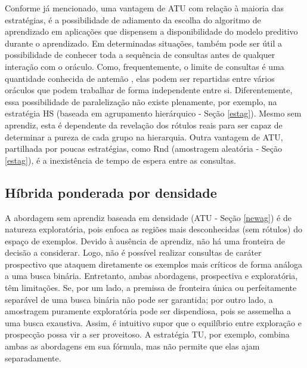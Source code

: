 Conforme já mencionado, uma vantagem de ATU com relação à maioria das estratégias, é a possibilidade de adiamento da escolha do algoritmo de aprendizado em aplicações que dispensem a disponibilidade do modelo preditivo durante o aprendizado.
Em determinadas situações, também pode ser útil a possibilidade de conhecer toda a sequência de consultas antes de qualquer interação com o oráculo.
Como, frequentemente, o limite de consultas é uma quantidade conhecida de antemão \cite{settles2010active}, elas podem ser repartidas entre vários oráculos que podem trabalhar de forma independente entre si.
Diferentemente, essa possibilidade de paralelização não existe plenamente, por exemplo, na estratégia HS (baseada em agrupamento hierárquico - Seção \ref{estag}).
Mesmo sem aprendiz, esta é dependente da revelação dos rótulos reais para ser capaz de determinar a pureza de cada grupo na hierarquia.
Outra vantagem de ATU, partilhada por poucas estratégias, como Rnd (amostragem aleatória - Seção \ref{estag}), é a inexistência de tempo de espera entre as consultas.

\subsection{Híbrida ponderada por densidade}\label{newhtu}
A abordagem sem aprendiz baseada em densidade (ATU - Seção \ref{newag}) é de natureza exploratória, pois enfoca as regiões mais desconhecidas (sem rótulos) do espaço de exemplos.
Devido à ausência de aprendiz, não há uma fronteira de decisão a considerar.
Logo, não é possível realizar consultas de caráter prospectivo que ataquem diretamente os exemplos mais críticos de forma análoga a uma busca binária.
Entretanto, ambas abordagens, prospectiva e exploratória, têm limitações.
Se, por um lado, a premissa de fronteira única ou perfeitamente separável de uma busca binária não pode ser garantida;
por outro lado, a amostragem puramente exploratória pode ser dispendiosa, pois se assemelha a uma busca exaustiva.
Assim, é intuitivo supor que o equilíbrio entre exploração e prospecção possa vir a ser proveitoso.
A estratégia TU, por exemplo, combina ambas as abordagens em sua fórmula, mas não permite que elas ajam separadamente.

